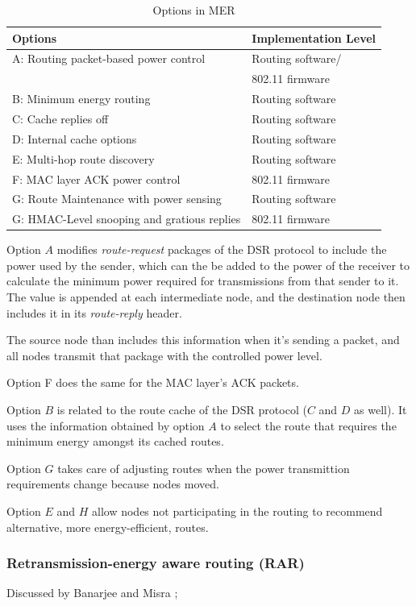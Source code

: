 \documentclass[conference]{IEEEtran}
\begin{document}
\begin{table}[tb]
  \begin{tabular}{ll}
    Options & Implementation Level  \\
    \hline
    A: Routing packet-based power control & Routing software/\\ &802.11 firmware \\
    B: Minimum energy routing & Routing software \\
    C: Cache replies off & Routing software \\
    D: Internal cache options & Routing software \\
    E: Multi-hop route discovery & Routing software \\
    F: MAC layer ACK power control & 802.11 firmware \\
    G: Route Maintenance with power sensing & Routing software \\
    G: HMAC-Level snooping and gratious replies & 802.11 firmware \\
  \end{tabular}
  \caption{Options in MER}
  \label{tbl:mer-options}
\end{table}

Option $A$ modifies \textit{route-request} packages of the DSR protocol to
include the power used by the sender, which can the be added to the power
of the receiver to calculate the minimum power required for transmissions
from that sender to it. The value is appended at each intermediate node, and the
destination node then includes it in its \textit{route-reply} header.

The source node than includes this information when it's sending a packet, and
all nodes transmit that package with the controlled power level.

Option F does the same for the MAC layer's ACK packets.

Option $B$ is related to the route cache of the DSR protocol ($C$ and $D$ as well). It
uses the information obtained by option $A$ to select the route that requires
the minimum energy amongst its cached routes.

Option $G$ takes care of adjusting routes when the power transmittion requirements
change because nodes moved.

Option $E$ and $H$ allow nodes not participating in the routing to recommend
alternative, more energy-efficient, routes.

\subsubsection{Retransmission-energy aware routing (RAR)}
Discussed by Banarjee and Misra \cite{banerjee2002minimum};
\end{document}
